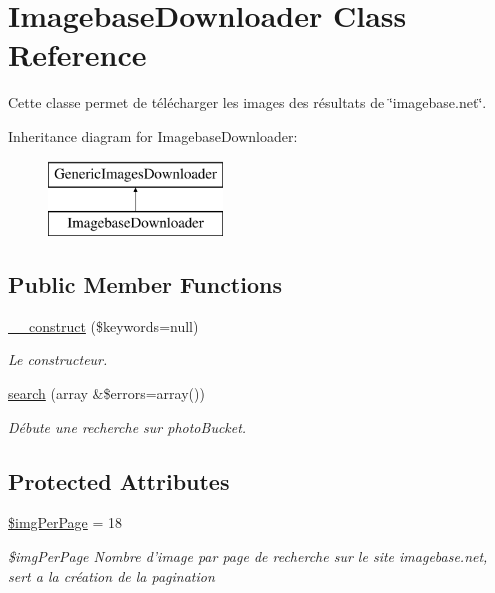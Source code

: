 \hypertarget{class_imagebase_downloader}{\section{Imagebase\-Downloader Class Reference}
\label{class_imagebase_downloader}
}


Cette classe permet de télécharger les images des résultats de \char`\"{}imagebase.\-net\char`\"{}.  


Inheritance diagram for Imagebase\-Downloader\-:\begin{figure}[H]
\begin{center}
\leavevmode
\includegraphics[height=2.000000cm]{class_imagebase_downloader}
\end{center}
\end{figure}
\subsection*{Public Member Functions}
\begin{DoxyCompactItemize}
\item 
\hyperlink{class_imagebase_downloader_af7a671cb2bc664328fb5224f0da6ef60}{\-\_\-\-\_\-construct} (\$keywords=null)
\begin{DoxyCompactList}\small\item\em Le constructeur. \end{DoxyCompactList}\item 
\hyperlink{class_imagebase_downloader_aeaf78020730e78dd35d16d14b527b44c}{search} (array \&\$errors=array())
\begin{DoxyCompactList}\small\item\em Débute une recherche sur photo\-Bucket. \end{DoxyCompactList}\end{DoxyCompactItemize}
\subsection*{Protected Attributes}
\begin{DoxyCompactItemize}
\item 
\hypertarget{class_imagebase_downloader_a8af857b050cdfa3d831eb246f8983cb5}{\hyperlink{class_imagebase_downloader_a8af857b050cdfa3d831eb246f8983cb5}{\$img\-Per\-Page} = 18}\label{class_imagebase_downloader_a8af857b050cdfa3d831eb246f8983cb5}

\begin{DoxyCompactList}\small\item\em \$img\-Per\-Page Nombre d'image par page de recherche sur le site imagebase.\-net, sert a la création de la pagination \end{DoxyCompactList}\end{DoxyCompactItemize}
